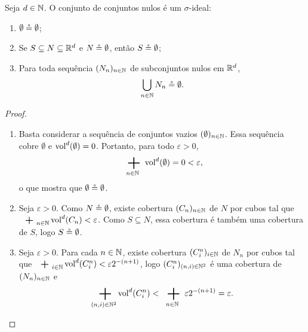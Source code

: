 \begin{proposition}
Seja $d \in \mathbb{N}$. O conjunto de conjuntos nulos é um $\sigma$-ideal:
	\begin{enumerate}
	\item $\emptyset \circeq \emptyset$;
	\item Se $S \subseteq N \subseteq \mathbb{R}^d$ e $N \circeq \emptyset$, então $S \circeq \emptyset$;
	\item Para toda sequência $(N_n)_{n \in \mathbb{N}}$ de subconjuntos nulos em $\mathbb{R}^d$,
		\begin{equation*}
		\bigcup_{n \in \mathbb{N}} N_n \circeq \emptyset.
		\end{equation*}
	\end{enumerate}
\end{proposition}
\begin{proof}
	\begin{enumerate}
	\item Basta considerar a sequência de conjuntos vazios $(\emptyset)_{n \in \mathbb{N}}$. Essa sequência cobre $\emptyset$ e $\operatorname{vol}^d(\emptyset)=0$. Portanto, para todo $\varepsilon > 0$,
	\begin{equation*}
	\sum_{n \in \N} \vol^d(\emptyset) = 0 < \varepsilon,
	\end{equation*}
o que mostra que $\emptyset \circeq \emptyset$.

	\item Seja $\varepsilon > 0$. Como $N \circeq \emptyset$, existe cobertura $(C_n)_{n \in \mathbb{N}}$ de $N$ por cubos tal que $\sum_{n \in \N} \vol^d(C_n) < \varepsilon$. Como $S \subseteq N$, essa cobertura é também uma cobertura de $S$, logo $S \circeq \emptyset$.

	\item Seja $\varepsilon > 0$. Para cada $n \in \mathbb{N}$, existe cobertura $(C^n_i)_{i \in \mathbb{N}}$ de $N_n$ por cubos tal que $\sum_{i \in \N} \vol^d(C^n_i) < \varepsilon2^{-(n+1)}$, logo $(C^n_i)_{(n,i) \in \mathbb{N}^2}$ é uma cobertura de $(N_n)_{n \in \mathbb{N}}$ e
		\begin{equation*}
		\sum_{(n,i) \in \N^2} \vol^d(C^n_{i}) < \sum_{n \in \N} \varepsilon2^{-(n+1)} = \varepsilon. \qedhere
		\end{equation*}
	\end{enumerate}
\end{proof}

